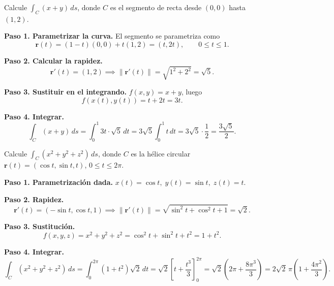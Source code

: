 \begin{example}
Calcule \(\displaystyle \int_C (x + y)\,ds\), donde \(C\) es el
segmento de recta desde \((0,0)\) hasta \((1,2)\).
\begin{myproof}
\textbf{Paso 1. Parametrizar la curva.}
El segmento se parametriza como
\[
\mathbf{r}(t) = (1-t)(0,0) + t(1,2) = (t, 2t), \qquad 0 \le t \le 1.
\]

\textbf{Paso 2. Calcular la rapidez.}
\[
\mathbf{r}'(t) = (1, 2) \implies
\|\mathbf{r}'(t)\| = \sqrt{1^2 + 2^2} = \sqrt{5}.
\]

\textbf{Paso 3. Sustituir en el integrando.}
\(f(x,y) = x + y\), luego
\[
f(x(t), y(t)) = t + 2t = 3t.
\]

\textbf{Paso 4. Integrar.}
\[
\int_C (x+y)\,ds =
\int_0^1 3t \cdot \sqrt{5}\,dt =
3\sqrt{5} \int_0^1 t\,dt =
3\sqrt{5} \cdot \frac{1}{2}
= \boxed{\frac{3\sqrt{5}}{2}}.
\]
\end{myproof}
\end{example}

\begin{example}
Calcule \(\displaystyle \int_C (x^2 + y^2 + z^2)\,ds\), donde \(C\) es
la hélice circular \(\mathbf{r}(t) = (\cos t, \sin t, t)\),
\(0 \le t \le 2\pi\).
\begin{myproof}
\textbf{Paso 1. Parametrización dada.}
\(x(t) = \cos t,\; y(t) = \sin t,\; z(t) = t\).

\textbf{Paso 2. Rapidez.}
\[
\mathbf{r}'(t) = (-\sin t, \cos t, 1) \implies
\|\mathbf{r}'(t)\| = \sqrt{\sin^2 t + \cos^2 t + 1} = \sqrt{2}.
\]

\textbf{Paso 3. Sustitución.}
\[
f(x,y,z) = x^2 + y^2 + z^2 = \cos^2 t + \sin^2 t + t^2 = 1 + t^2.
\]

\textbf{Paso 4. Integrar.}
\[
\int_C (x^2 + y^2 + z^2)\,ds =
\int_0^{2\pi} (1 + t^2)\sqrt{2}\,dt =
\sqrt{2} \left[ t + \frac{t^3}{3} \right]_0^{2\pi}
= \sqrt{2} \left( 2\pi + \frac{8\pi^3}{3} \right)
= \boxed{2\sqrt{2}\,\pi \left(1 + \frac{4\pi^2}{3}\right)}.
\]
\end{myproof}
\end{example}

